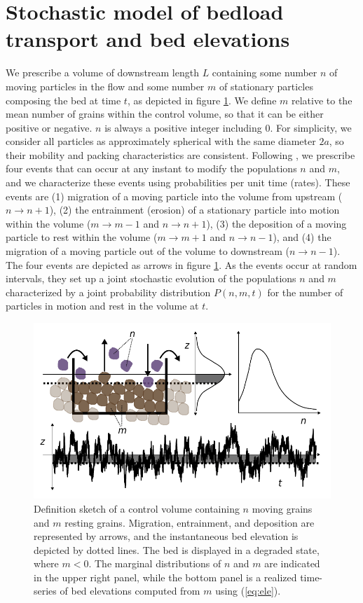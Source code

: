 \documentclass[draft]{agujournal2018}
\begin{document}
\section{Stochastic model of bedload transport and bed elevations}
\label{sec:model}

We prescribe a volume of downstream length $L$ containing some number $n$ of moving particles in the flow and some number $m$ of stationary particles composing the bed at time $t$, as depicted in figure \ref{fig:definition}. We define $m$ relative to the mean number of grains within the control volume, so that it can be either positive or negative. $n$ is always a positive integer including $0$.
For simplicity, we consider all particles as approximately spherical with the same diameter $2a$, so their mobility and packing characteristics are consistent.
Following \citet{Ancey2008}, we prescribe four events that can occur at any instant to modify the populations $n$ and $m$, and we characterize these events using probabilities per unit time (rates).
These events are (1) migration of a moving particle into the volume from upstream ($n \rightarrow n+1$), (2) the entrainment (erosion) of a stationary particle into motion within the volume ($m\rightarrow m-1$ and $n\rightarrow n+1$), (3) the deposition of a moving particle to rest within the volume ($m\rightarrow m+1$ and $n\rightarrow n-1$), and (4) the migration of a moving particle out of the volume to downstream ($n\rightarrow n-1$).
The four events are depicted as arrows in figure \ref{fig:definition}.
As the events occur at random intervals, they set up a joint stochastic evolution of the populations $n$ and $m$ characterized by a joint probability distribution $P(n,m,t)$ for the number of particles in motion and rest in the volume at $t$.
\begin{figure}[!ht]
	\includegraphics[width=\linewidth,keepaspectratio]{definition.pdf}
	\caption{Definition sketch of a control volume containing $n$ moving grains and $m$ resting grains. Migration, entrainment, and deposition are represented by arrows, and the instantaneous bed elevation is depicted by dotted lines. The bed is displayed in a degraded state, where $m<0$. The marginal distributions of $n$ and $m$ are indicated in the upper right panel, while the bottom panel is a realized time-series of bed elevations computed from $m$ using (\ref{eq:ele}).}
	\label{fig:definition}
\end{figure}
\end{document}
